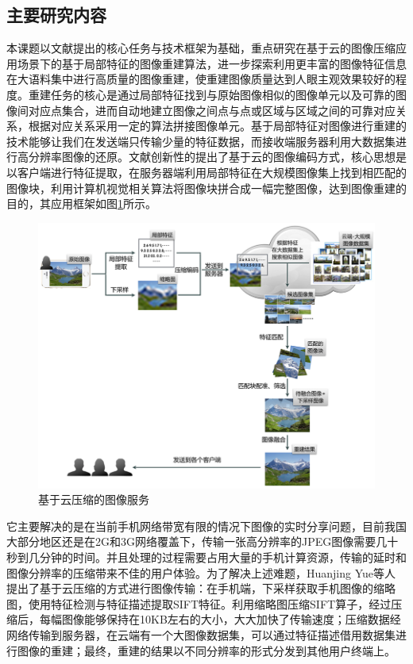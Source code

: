 \subsection{主要研究内容}

本课题以文献\cite{Yue:2013gl}提出的核心任务与技术框架为基础，重点研究在基于云的图像压缩应用场景下的基于局部特征的图像重建算法，进一步探索利用更丰富的图像特征信息在大语料集中进行高质量的图像重建，使重建图像质量达到人眼主观效果较好的程度。重建任务的核心是通过局部特征找到与原始图像相似的图像单元以及可靠的图像间对应点集合，进而自动地建立图像之间点与点或区域与区域之间的可靠对应关系，根据对应关系采用一定的算法拼接图像单元。基于局部特征对图像进行重建的技术能够让我们在发送端只传输少量的特征数据，而接收端服务器利用大数据集进行高分辨率图像的还原。文献\cite{Yue:2013gl}创新性的提出了基于云的图像编码方式，核心思想是以客户端进行特征提取，在服务器端利用局部特征在大规模图像集上找到相匹配的图像块，利用计算机视觉相关算法将图像块拼合成一幅完整图像，达到图像重建的目的，其应用框架如图\ref{fig:service}所示。

\begin{figure}
\centering\includegraphics[width=15cm]{imgs/ch1/super_overview}
\caption{基于云压缩的图像服务}
\label{fig:service}
\end{figure}

它主要解决的是在当前手机网络带宽有限的情况下图像的实时分享问题，目前我国大部分地区还是在2G和3G网络覆盖下，传输一张高分辨率的JPEG图像需要几十秒到几分钟的时间。并且处理的过程需要占用大量的手机计算资源，传输的延时和图像分辨率的压缩带来不佳的用户体验。为了解决上述难题，Huanjing Yue等人提出了基于云压缩的方式进行图像传输：在手机端，下采样获取手机图像的缩略图，使用特征检测与特征描述提取SIFT特征。利用缩略图压缩SIFT算子，经过压缩后，每幅图像能够保持在10KB左右的大小，大大加快了传输速度；压缩数据经网络传输到服务器，在云端有一个大图像数据集，可以通过特征描述借用数据集进行图像的重建；最终，重建的结果以不同分辨率的形式分发到其他用户终端上。


